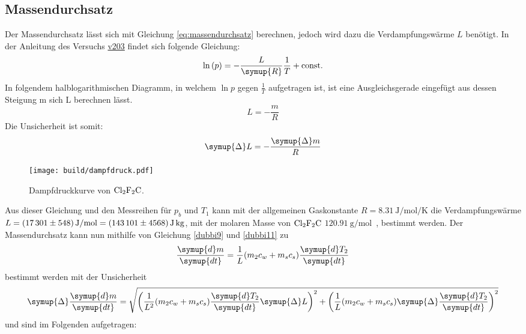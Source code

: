 \subsection{Massendurchsatz}
Der Massendurchsatz lässt sich mit Gleichung \eqref{eq:massendurchsatz} berechnen, jedoch wird dazu die Verdampfungswärme
$L$ benötigt.
In der Anleitung des Versuchs \href{http://129.217.224.2/HOMEPAGE/PHYSIKER/BACHELOR/AP/SKRIPT/V203.pdf}{v203} findet sich
folgende Gleichung:
\begin{equation}
    \ln \left(p\right) = -\frac{L}{\symup{R}} \frac{1}{T} + \text{const.}
\end{equation}
In folgendem halblogarithmischen Diagramm, in welchem $\ln{p}$ gegen $\frac{1}{T}$ 
aufgetragen ist, ist eine Ausgleichsgerade eingefügt aus dessen Steigung m sich L berechnen 
lässt.
\begin{equation}
    L = -\frac{m}{R}
\end{equation}
Die Unsicherheit ist somit:
\begin{equation}
    \symup{\Delta}L = -\frac{\symup{\Delta}m}{R}
\end{equation}
\begin{figure}[H]
    \centering
    \texttt{[image: build/dampfdruck.pdf]}
    \caption{Dampfdruckkurve von $\ce{Cl2F2C}$.}
\end{figure}
%
Aus dieser Gleichung und den Messreihen für $p_b$ und $T_1$ kann mit der allgemeinen 
Gaskonstante \mbox{$R=\SI{8.31}{\joule\per\mole\per\kelvin}$}
die Verdampfungswärme \mbox{$L=\SI{17301\pm548}{\joule\per\mole}=\SI{143101\pm4568}{\joule\kilogram}$}, mit der molaren
Masse von $\ce{Cl2F2C}$
\mbox{$\SI{120.91}{\gram\per\mole}$ \cite{molar}}, bestimmt werden.
%
Der Massendurchsatz kann nun mithilfe von Gleichung \eqref{dubbi9} und \eqref{dubbi11} 
zu
\begin{equation}
    \frac{\symup{d}m}{\symup{dt}} = \frac{1}{L}(m_2c_w + m_sc_s)\frac{\symup{d}T_2}{\symup{dt}}
\end{equation}
bestimmt werden mit der Unsicherheit
\begin{equation}
    \symup{\Delta}\frac{\symup{d}m}{\symup{dt}} = 
    \sqrt{
        \left(\frac{1}{L^2}(m_2c_w + m_sc_s)\frac{\symup{d}T_2}{\symup{dt}}\symup{\Delta}L\right)^2 + 
        \left(\frac{1}{L}(m_2c_w + m_sc_s)\symup{\Delta}\frac{\symup{d}T_2}{\symup{dt}}\right)^2
    }
\end{equation}
und sind im Folgenden aufgetragen:
